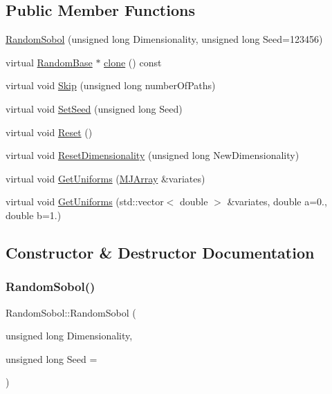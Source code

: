 \subsection*{Public Member Functions}
\begin{DoxyCompactItemize}
\item 
\hyperlink{classRandomSobol_a45c752ed9fafc8e520856b825050edf1}{Random\+Sobol} (unsigned long Dimensionality, unsigned long Seed=123456)
\item 
virtual \hyperlink{classRandomBase}{Random\+Base} $\ast$ \hyperlink{classRandomSobol_ac0c06a34aa22ed8caa009d42d3212365}{clone} () const
\item 
virtual void \hyperlink{classRandomSobol_a1bd5c22ad3a808a4ff9ca8706fdb0b58}{Skip} (unsigned long number\+Of\+Paths)
\item 
virtual void \hyperlink{classRandomSobol_a6ede3a4386bf79e05dd0c1985cc4b3ca}{Set\+Seed} (unsigned long Seed)
\item 
virtual void \hyperlink{classRandomSobol_a7a749c87dec7a74d18d22edbb753f65a}{Reset} ()
\item 
virtual void \hyperlink{classRandomSobol_a14db32657f70fcbb0b3847caacddabc2}{Reset\+Dimensionality} (unsigned long New\+Dimensionality)
\item 
virtual void \hyperlink{classRandomSobol_ad4174c772925a5895828bcc87cc69fd6}{Get\+Uniforms} (\hyperlink{classMJArray}{M\+J\+Array} \&variates)
\item 
virtual void \hyperlink{classRandomSobol_ab358820392404ae723a0148d4d014553}{Get\+Uniforms} (std\+::vector$<$ double $>$ \&variates, double a=0., double b=1.)
\end{DoxyCompactItemize}


\subsection{Constructor \& Destructor Documentation}
\hypertarget{classRandomSobol_a45c752ed9fafc8e520856b825050edf1}{}\label{classRandomSobol_a45c752ed9fafc8e520856b825050edf1} 
\subsubsection{\texorpdfstring{Random\+Sobol()}{RandomSobol()}}
{\footnotesize\ttfamily Random\+Sobol\+::\+Random\+Sobol (\begin{DoxyParamCaption}\item[{unsigned long}]{Dimensionality,  }\item[{unsigned long}]{Seed = {} }\end{DoxyParamCaption})}



